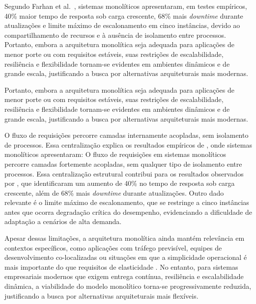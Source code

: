 Segundo Farhan et al.~\cite{farhan2023performance}, sistemas monolíticos apresentaram, em testes empíricos, 40\% maior tempo de resposta sob carga crescente, 68\% mais \textit{downtime} durante atualizações e limite máximo de escalonamento em cinco instâncias, devido ao compartilhamento de recursos e à ausência de isolamento entre processos. Portanto, embora a arquitetura monolítica seja adequada para aplicações de menor porte ou com requisitos estáveis, suas restrições de escalabilidade, resiliência e flexibilidade tornam-se evidentes em ambientes dinâmicos e de grande escala, justificando a busca por alternativas arquiteturais mais modernas.

Portanto, embora a arquitetura monolítica seja adequada para aplicações de menor porte ou com requisitos estáveis, suas restrições de escalabilidade, resiliência e flexibilidade tornam-se evidentes em ambientes dinâmicos e de grande escala, justificando a busca por alternativas arquiteturais mais modernas.

O fluxo de requisições percorre camadas internamente acopladas, sem isolamento de processos. Essa centralização explica os resultados empíricos de \cite{farhan2023performance}, onde sistemas monolíticos apresentaram:
O fluxo de requisições em sistemas monolíticos percorre camadas fortemente acopladas, sem qualquer tipo de isolamento entre processos. Essa centralização estrutural contribui para os resultados observados por \cite{farhan2023performance}, que identificaram um aumento de 40\% no tempo de resposta sob carga crescente, além de 68\% mais \textit{downtime} durante atualizações. Outro dado relevante é o limite máximo de escalonamento, que se restringe a cinco instâncias antes que ocorra degradação crítica do desempenho, evidenciando a dificuldade de adaptação a cenários de alta demanda.

Apesar dessas limitações, a arquitetura monolítica ainda mantém relevância em contextos específicos, como aplicações com tráfego previsível, equipes de desenvolvimento co-localizadas ou situações em que a simplicidade operacional é mais importante do que requisitos de elasticidade \cite{shekhar2023microservices}. No entanto, para sistemas empresariais modernos que exigem entrega contínua, resiliência e escalabilidade dinâmica, a viabilidade do modelo monolítico torna-se progressivamente reduzida, justificando a busca por alternativas arquiteturais mais flexíveis.

